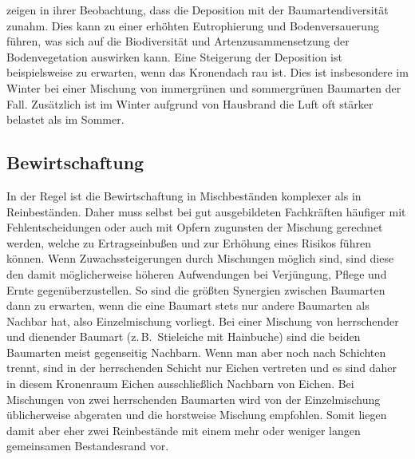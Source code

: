 \documentclass[twocolumn, paper=a4, fontsize=10pt, bibliography=totoc, index=totoc]{scrartcl}
\begin{document}
\citet{zhang2022MischwaldDeposition} zeigen in
ihrer Beobachtung, dass die Deposition mit der Baumartendiversität
zunahm. Dies kann zu einer erhöhten Eutrophierung und Bodenversauerung
führen, was sich auf die Biodiversität und Artenzusammensetzung der
Bodenvegetation auswirken kann. Eine Steigerung der Deposition ist beispielsweise zu erwarten, wenn das Kronendach rau ist. Dies ist insbesondere im Winter bei einer Mischung von immergrünen und sommergrünen Baumarten der Fall. Zusätzlich ist im Winter aufgrund von Hausbrand die Luft oft stärker belastet als im Sommer.

\subsection{Bewirtschaftung}
\label{ssec:bewirtschaftung}

In der Regel ist die Bewirtschaftung in Mischbeständen komplexer als
in Reinbeständen. Daher muss selbst bei gut ausgebildeten
Fachkräften häufiger mit Fehlentscheidungen oder auch mit Opfern
zugunsten der Mischung gerechnet werden, welche zu Ertragseinbußen und
zur Erhöhung eines Risikos führen können. Wenn Zuwachssteigerungen
durch Mischungen möglich sind, sind diese den damit möglicherweise
höheren Aufwendungen bei Verjüngung, Pflege und Ernte
gegenüberzustellen. So sind die größten Synergien zwischen Baumarten
dann zu erwarten, wenn die eine Baumart stets nur andere Baumarten als
Nachbar hat, also Einzelmischung vorliegt. Bei einer Mischung von
herrschender und dienender Baumart (z.\,B.\ Stieleiche mit Hainbuche)
sind die beiden Baumarten meist gegenseitig Nachbarn. Wenn man aber noch nach Schichten trennt, sind in der herrschenden Schicht nur Eichen vertreten und es sind daher in diesem Kronenraum Eichen ausschließlich Nachbarn von Eichen.
Bei Mischungen von zwei herrschenden Baumarten
wird von der Einzelmischung üblicherweise abgeraten und die
horstweise Mischung empfohlen. Somit liegen damit aber eher zwei
Reinbestände mit einem mehr oder weniger langen gemeinsamen
Bestandesrand vor.
\end{document}
